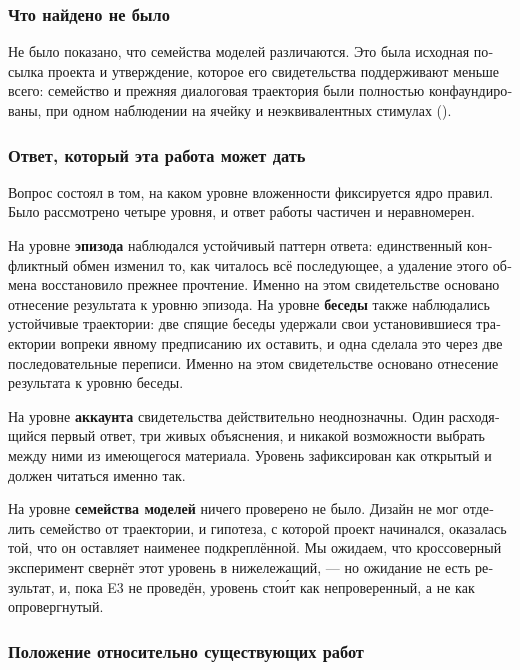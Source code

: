 \begin{russian}
\subsubsection*{Что найдено не было}
\label{sec:ru:x--27}

Не было показано, что семейства моделей различаются. Это была исходная посылка проекта и утверждение, которое его свидетельства поддерживают меньше всего: семейство и прежняя диалоговая траектория были полностью конфаундированы, при одном наблюдении на ячейку и неэквивалентных стимулах ().


\subsubsection*{Ответ, который эта работа может дать}
\label{sec:ru:x--28}

Вопрос состоял в том, на каком уровне вложенности фиксируется ядро правил. Было рассмотрено четыре уровня, и ответ работы частичен и неравномерен.

На уровне \textbf{эпизода} наблюдался устойчивый паттерн ответа: единственный конфликтный обмен изменил то, как читалось всё последующее, а удаление этого обмена восстановило прежнее прочтение. Именно на этом свидетельстве основано отнесение результата к уровню эпизода. На уровне \textbf{беседы} также наблюдались устойчивые траектории: две спящие беседы удержали свои установившиеся траектории вопреки явному предписанию их оставить, и одна сделала это через две последовательные переписи. Именно на этом свидетельстве основано отнесение результата к уровню беседы.

На уровне \textbf{аккаунта} свидетельства действительно неоднозначны. Один расходящийся первый ответ, три живых объяснения, и никакой возможности выбрать между ними из имеющегося материала. Уровень зафиксирован как открытый и должен читаться именно так.

На уровне \textbf{семейства моделей} ничего проверено не было. Дизайн не мог отделить семейство от траектории, и гипотеза, с которой проект начинался, оказалась той, что он оставляет наименее подкреплённой. Мы ожидаем, что кроссоверный эксперимент свернёт этот уровень в нижележащий, — но ожидание не есть результат, и, пока E3 не проведён, уровень стои́т как непроверенный, а не как опровергнутый.


\subsubsection*{Положение относительно существующих работ}
\label{sec:ru:x--29}


\end{russian}
